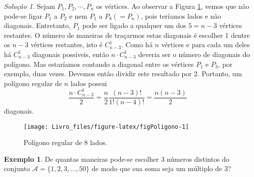 \documentclass[]{book}
\theoremstyle{definition}
\theoremstyle{definition}
\newtheorem{example}{Exemplo}[chapter]
\theoremstyle{definition}
\theoremstyle{remark}
\newtheorem*{solution}{Solução}
\begin{document}
\begin{solution}
\iffalse{} {Solução. } \fi{}Sejam \(P_1, P_2, \cdots, P_n\) os vértices.
Ao observar a Figura \ref{fig:figPoligono}, vemos que não pode-se ligar \(P_1\) a \(P_2\) e nem \(P_1\) a \(P_8 (=P_n)\), pois teríamos lados e não diagonais.
Entretanto, \(P_1\) pode ser ligado a qualquer um dos \(5 = n-3\) vértices restantes.
O número de maneiras de traçarmos estas diagonais é escolher 1 dentre os \(n-3\) vértices restantes, isto é \(C^{1}_{n-3}\).
Como há \(n\) vértices e para cada um deles há \(C^{1}_{n-3}\) diagonais possíveis, então \(n \cdot C^{1}_{n-3}\) deveria ser o número de diagonais do polígono.
Mas estaríamos contando a diagonal entre os vértices \(P_1\) e \(P_3\), por exemplo, duas vezes.
Devemos então dividir este resultado por \(2\).
Portanto, um polígono regular de \(n\) lados possui
\[ \frac{n \cdot C^{1}_{n-3}}{2} = \frac{n}{2}\frac{(n-3)!}{1!(n-4)!} = \frac{n(n-3)}{2} \]
diagonais.
\end{solution}

\begin{figure}

{\centering \texttt{[image: Livro\_files/figure-latex/figPoligono-1]} 

}

\caption{Polígono regular de 8 lados.}\label{fig:figPoligono}
\end{figure}

\begin{example}
\protect\hypertarget{exm:unnamed-chunk-81}{}{\label{exm:unnamed-chunk-81} }De quantas maneiras pode-se escolher \(3\) números distintos do conjunto \(\mathcal{A}=\{1, 2, 3, \ldots, 50\}\) de modo que sua soma seja um múltiplo de \(3\)?
\end{example}
\end{document}
